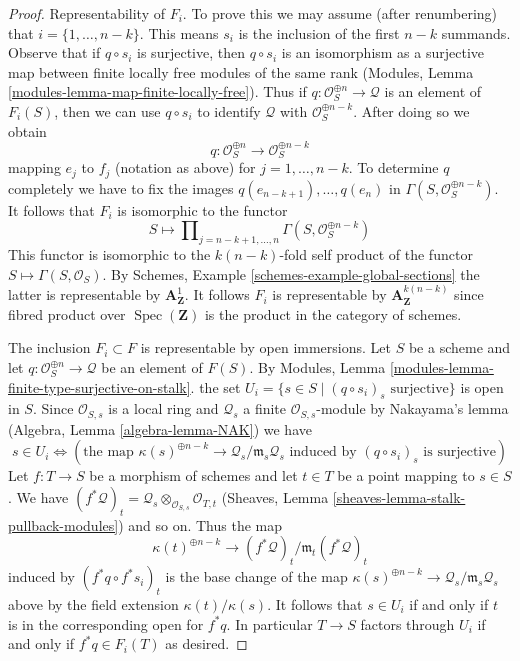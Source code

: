 \documentclass{stacks-project}
\theoremstyle{plain}
\theoremstyle{definition}
\theoremstyle{remark}
\numberwithin{equation}{subsection}
\def\Spec{\mathop{\mathrm{Spec}}}
\begin{document}
\begin{proof}
\medskip\noindent
Representability of $F_i$. To prove this we may assume (after renumbering)
that $i = \{1, \ldots, n - k\}$. This means $s_i$ is the inclusion of
the first $n - k$ summands. Observe that if $q \circ s_i$ is surjective,
then $q \circ s_i$ is an isomorphism as a surjective map between finite
locally free modules of the same rank
(Modules, Lemma \ref{modules-lemma-map-finite-locally-free}).
Thus if $q : \mathcal{O}_S^{\oplus n} \to \mathcal{Q}$ is an element of
$F_i(S)$, then we can use $q \circ s_i$ to identify $\mathcal{Q}$ with
$\mathcal{O}_S^{\oplus n - k}$. After doing so we obtain
$$
q : \mathcal{O}_S^{\oplus n} \longrightarrow \mathcal{O}_S^{\oplus n - k}
$$
mapping $e_j$ to $f_j$ (notation as above) for $j = 1, \ldots, n - k$.
To determine $q$ completely we have to fix the images
$q(e_{n - k + 1}), \ldots, q(e_n)$ in
$\Gamma(S, \mathcal{O}_S^{\oplus n - k})$.
It follows that $F_i$ is isomorphic to the functor
$$
S \longmapsto
\prod\nolimits_{j = n - k + 1, \ldots, n}
\Gamma(S,  \mathcal{O}_S^{\oplus n - k})
$$
This functor is isomorphic to the $k(n - k)$-fold self product of the functor
$S \mapsto \Gamma(S, \mathcal{O}_S)$. By
Schemes, Example \ref{schemes-example-global-sections}
the latter is representable by $\mathbf{A}^1_\mathbf{Z}$. It follows $F_i$
is representable by $\mathbf{A}^{k(n - k)}_\mathbf{Z}$ since fibred product
over $\Spec(\mathbf{Z})$ is the product in the category of schemes.

\medskip\noindent
The inclusion $F_i \subset F$ is representable by open immersions.
Let $S$ be a scheme and let
$q : \mathcal{O}_S^{\oplus n} \to \mathcal{Q}$ be an element of
$F(S)$. By
Modules, Lemma \ref{modules-lemma-finite-type-surjective-on-stalk}.
the set $U_i = \{s \in S \mid (q \circ s_i)_s\text{ surjective}\}$
is open in $S$. Since $\mathcal{O}_{S, s}$ is a local ring
and $\mathcal{Q}_s$ a finite $\mathcal{O}_{S, s}$-module
by Nakayama's lemma (Algebra, Lemma \ref{algebra-lemma-NAK}) we have
$$
s \in U_i \Leftrightarrow
\left(
\text{the map }
\kappa(s)^{\oplus n - k} \to \mathcal{Q}_s/\mathfrak m_s\mathcal{Q}_s
\text{ induced by }
(q \circ s_i)_s
\text{ is surjective}
\right)
$$
Let $f : T \to S$ be a morphism of schemes and let $t \in T$ be a point
mapping to $s \in S$. We have
$(f^*\mathcal{Q})_t =
\mathcal{Q}_s \otimes_{\mathcal{O}_{S, s}} \mathcal{O}_{T, t}$
(Sheaves, Lemma \ref{sheaves-lemma-stalk-pullback-modules})
and so on. Thus the map
$$
\kappa(t)^{\oplus n - k} \to (f^*\mathcal{Q})_t/\mathfrak m_t(f^*\mathcal{Q})_t
$$
induced by $(f^*q \circ f^*s_i)_t$ is the base change of the map
$\kappa(s)^{\oplus n - k} \to \mathcal{Q}_s/\mathfrak m_s\mathcal{Q}_s$
above by the field extension $\kappa(t)/\kappa(s)$. It follows
that $s \in U_i$ if and only if $t$ is in the corresponding open
for $f^*q$. In particular $T \to S$ factors through $U_i$ if
and only if $f^*q \in F_i(T)$ as desired.


\end{proof}
\end{document}
